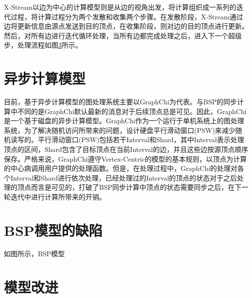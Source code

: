 X-Stream以边为中心的计算模型则是从边的视角出发，将计算组织成一系列的迭代过程，将计算过程分为两个发散和收集两个步骤。在发散阶段，X-Stream通过边将更新信息由源点发送到目的顶点，在收集阶段，则对边的目的顶点进行更新。然后，对所有边进行迭代循环处理，当所有边都完成处理之后，进入下一个超级步，处理流程如图\ref{}所示。

\section{异步计算模型}
目前，基于异步计算模型的图处理系统主要以GraphChi为代表。与BSP的同步计算中不同的是GraphChi默认最新的消息对于后续顶点总是可见。因此，GraphChi是一个基于磁盘的异步计算模型。GraphChi作为一个运行于单机系统上的图处理系统，为了解决随机访问所带来的问题，设计硬盘平行滑动窗口(PSW)来减少随机读写的。平行滑动窗口(PSW)包括若干Interval和Shard，其中Interval表示处理顶点的区间，Shard包含了目标顶点在当前Interval的边，并且这些边按源顶点顺序保存。严格来说，GraphChi遵守Vertex-Centric的模型的基本规则，以顶点为计算的中心病调用用户提供的处理函数。但是，在处理过程中，GraphChi的处理对各个Interval和Shard进行依次处理，已经处理过的Interval的顶点的状态对于之后处理的顶点而言是可见的，打破了BSP同步计算中顶点的状态需要同步之后，在下一轮迭代中进行计算所带来的开销。

\section{BSP模型的缺陷}
如图所示，BSP模型


\section{模型改进}


